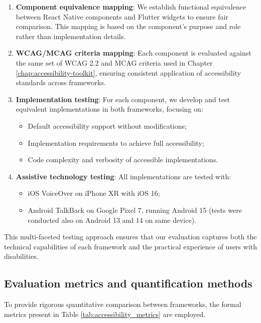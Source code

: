 \begin{enumerate}
    \item \textbf{Component equivalence mapping}: We establish functional equivalence between React Native components and Flutter widgets to ensure fair comparison. This mapping is based on the component's purpose and role rather than implementation details.
    
    \item \textbf{WCAG/MCAG criteria mapping}: Each component is evaluated against the same set of WCAG 2.2 and MCAG criteria used in Chapter \ref{chap:accessibility-toolkit}, ensuring consistent application of accessibility standards across frameworks.
    
    \item \textbf{Implementation testing}: For each component, we develop and test equivalent implementations in both frameworks, focusing on:
    \begin{itemize}
        \item Default accessibility support without modifications;
        \item Implementation requirements to achieve full accessibility;
        \item Code complexity and verbosity of accessible implementations.
    \end{itemize}
    
    \item \textbf{Assistive technology testing}: All implementations are tested with:
    \begin{itemize}
        \item iOS VoiceOver on iPhone XR with iOS 16;
        \item Android TalkBack on Google Pixel 7, running Android 15 (tests were conducted also on Android 13 and 14 on same device).
    \end{itemize}
\end{enumerate}

This multi-faceted testing approach ensures that our evaluation captures both the technical capabilities of each framework and the practical experience of users with disabilities.

\subsection{Evaluation metrics and quantification methods}

To provide rigorous quantitative comparison between frameworks, the formal metrics present in Table \ref{tab:accessibility_metrics} are employed.

